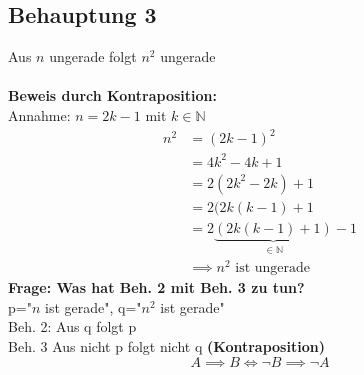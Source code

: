 \documentclass{article}
\begin{document}
        \subsection{Behauptung 3}
            Aus $n$ ungerade folgt $n^2$ ungerade\\\\
            \textbf{Beweis durch Kontraposition:}\\
                Annahme: $n=2k-1$ mit $k\in \mathbb{N}$
                \begin{align*}
                    n^2 &= (2k-1)^2 \\
                    \, &= 4k^2 - 4k + 1 \\
                    \, &= 2(2k^2 - 2k) + 1 \\
                    \, &= 2(2k(k-1) + 1 \\
                    \, &= 2\underbrace{(2k(k-1)+1)}_{\in \mathbb{N}} - 1 \\
                    &\implies n^2 \text{ ist ungerade}
                \end{align*}
            \textbf{Frage: Was hat Beh. 2 mit Beh. 3 zu tun?}\\
            p="$n$ ist gerade", q="$n^2$ ist gerade"\\
            Beh. 2: Aus q folgt p\\
            Beh. 3 Aus nicht p folgt nicht q \textbf{(Kontraposition)}
            \textbf{$$A\implies B \Leftrightarrow \lnot B \implies \lnot A$$}
\end{document}
